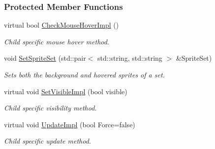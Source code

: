 \subsubsection*{Protected Member Functions}
\begin{DoxyCompactItemize}
\item 
\hypertarget{classMezzanine_1_1UI_1_1CheckBox_a6a9f31c4bd0915b7405c10b8bfe6710a}{
virtual bool \hyperlink{classMezzanine_1_1UI_1_1CheckBox_a6a9f31c4bd0915b7405c10b8bfe6710a}{CheckMouseHoverImpl} ()}
\label{classMezzanine_1_1UI_1_1CheckBox_a6a9f31c4bd0915b7405c10b8bfe6710a}

\begin{DoxyCompactList}\small\item\em Child specific mouse hover method. \item\end{DoxyCompactList}\item 
\hypertarget{classMezzanine_1_1UI_1_1CheckBox_a8a32068338e6fedcf5d53d3eae5d909a}{
void \hyperlink{classMezzanine_1_1UI_1_1CheckBox_a8a32068338e6fedcf5d53d3eae5d909a}{SetSpriteSet} (std::pair$<$ std::string, std::string $>$ \&SpriteSet)}
\label{classMezzanine_1_1UI_1_1CheckBox_a8a32068338e6fedcf5d53d3eae5d909a}

\begin{DoxyCompactList}\small\item\em Sets both the background and hovered sprites of a set. \item\end{DoxyCompactList}\item 
\hypertarget{classMezzanine_1_1UI_1_1CheckBox_a60b8cce148408b94f7ec3942b2ddcedd}{
virtual void \hyperlink{classMezzanine_1_1UI_1_1CheckBox_a60b8cce148408b94f7ec3942b2ddcedd}{SetVisibleImpl} (bool visible)}
\label{classMezzanine_1_1UI_1_1CheckBox_a60b8cce148408b94f7ec3942b2ddcedd}

\begin{DoxyCompactList}\small\item\em Child specific visibility method. \item\end{DoxyCompactList}\item 
\hypertarget{classMezzanine_1_1UI_1_1CheckBox_a1dcc1684b11c57f2c47153836ffe7c0a}{
virtual void \hyperlink{classMezzanine_1_1UI_1_1CheckBox_a1dcc1684b11c57f2c47153836ffe7c0a}{UpdateImpl} (bool Force=false)}
\label{classMezzanine_1_1UI_1_1CheckBox_a1dcc1684b11c57f2c47153836ffe7c0a}

\begin{DoxyCompactList}\small\item\em Child specific update method. \item\end{DoxyCompactList}\end{DoxyCompactItemize}
